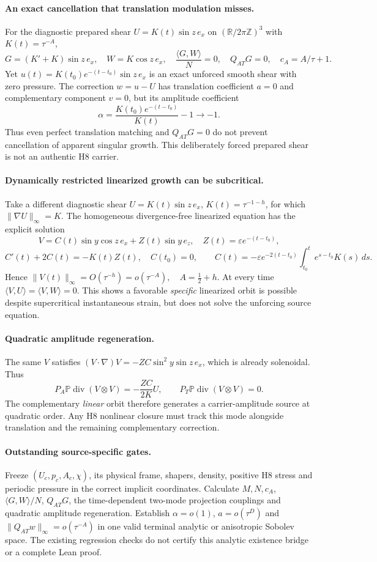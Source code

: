 \paragraph{An exact cancellation that translation modulation misses.}
For the diagnostic prepared shear $U=K(t)\sin z\,e_x$ on
$(\mathbb R/2\pi\mathbb Z)^3$ with $K(t)=\tau^{-A}$,
\[
G=(K'+K)\sin z\,e_x,\quad
W=K\cos z\,e_x,\quad
\boxed{\frac{\langle G,W\rangle}{N}=0,\quad
Q_{AT}G=0,\quad c_A=A/\tau+1.}
\]
Yet $u(t)=K(t_0)e^{-(t-t_0)}\sin z\,e_x$ is an exact
unforced smooth shear with zero pressure. The correction
$w=u-U$ has translation coefficient $a=0$ and complementary
component $v=0$, but its amplitude coefficient
\[
\boxed{\alpha=\frac{K(t_0)e^{-(t-t_0)}}{K(t)}-1\to-1.}
\]
Thus even perfect translation matching and $Q_{AT}G=0$
do not prevent cancellation of apparent singular growth.
This deliberately forced prepared shear is not an authentic H8 carrier.

\paragraph{Dynamically restricted linearized growth can be subcritical.}
Take a different diagnostic shear $U=K(t)\sin z\,e_x$,
$K(t)=\tau^{-1-h}$, for which $\|\nabla U\|_\infty=K$.
The homogeneous divergence-free linearized equation has
the explicit solution
\[
V=C(t)\sin y\cos z\,e_x+Z(t)\sin y\,e_z,
\quad Z(t)=\varepsilon e^{-(t-t_0)},
\]
\[
C'(t)+2C(t)=-K(t)Z(t),\quad C(t_0)=0,\qquad
C(t)=-\varepsilon e^{-2(t-t_0)}
\int_{t_0}^t e^{s-t_0}K(s)\,ds.
\]
Hence $\boxed{\|V(t)\|_\infty=O(\tau^{-h})
=o(\tau^{-A}),\quad A=\frac12+h.}$
At every time $\langle V,U\rangle=\langle V,W\rangle=0$.
This shows a favorable \emph{specific} linearized orbit is possible
despite supercritical instantaneous strain, but does not solve
the unforcing source equation.

\paragraph{Quadratic amplitude regeneration.}
The same $V$ satisfies
$(V\cdot\nabla)V=-ZC\sin^2y\sin z\,e_x$,
which is already solenoidal. Thus
\[
\boxed{\quad
P_A\mathbb P\operatorname{div}(V\otimes V)
=-\frac{ZC}{2K}U,\qquad
P_T\mathbb P\operatorname{div}(V\otimes V)=0.\quad}
\]
The complementary \emph{linear} orbit therefore generates a
carrier-amplitude source at quadratic order. Any H8 nonlinear
closure must track this mode alongside translation and the
remaining complementary correction.

\paragraph{Outstanding source-specific gates.}
Freeze $(U_c,p_c,A_c,\chi)$, its physical frame, shapers,
density, positive H8 stress and periodic pressure in the correct
implicit coordinates. Calculate $M,N,c_A$, $\langle G,W\rangle/N$,
$Q_{AT}G$, the time-dependent two-mode projection couplings and
quadratic amplitude regeneration. Establish
$\alpha=o(1)$, $a=o(\tau^D)$ and
$\|Q_{AT}w\|_\infty=o(\tau^{-A})$ in one valid terminal analytic
or anisotropic Sobolev space. The existing regression checks
do not certify this analytic existence bridge or a complete Lean proof.
